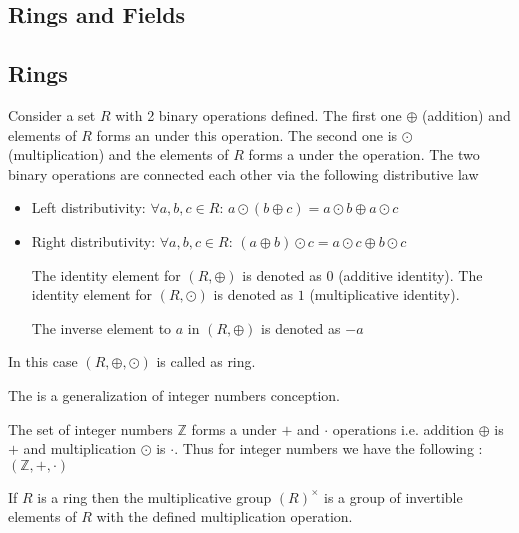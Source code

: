 \begin{appendices}
\section{Rings and Fields}

\subsection{Rings}

\begin{definition}[Ring]
  Consider a set $R$ with 2 binary operations defined. The first one
  $\oplus$ (addition) and elements of $R$ forms an
  under this operation. The second one is $\odot$ (multiplication) and
  the elements of $R$ forms a  under 
  the operation. The two binary operations are connected each other
  via the following distributive law
  \begin{itemize}
  \item Left distributivity:
    $\forall a,b,c \in R$:
    $a \odot \left(b \oplus c\right) =
    a \odot b \oplus a \odot c$
  \item Right distributivity:
    $\forall a,b,c \in R$:
    $\left( a \oplus b \right) \odot c =
    a \odot c \oplus b \odot c$
    
  The identity element for $\left(R, \oplus\right)$ is denoted as $0$
  (additive identity).
  The identity element for $\left(R, \odot\right)$ is denoted as $1$
  (multiplicative identity).

  The inverse element to $a$ in $\left(R, \oplus\right)$ is denoted as $-a$
  \end{itemize}

  In this case $\left(R, \oplus, \odot\right)$ is called as ring.
  \label{def:ring}
\end{definition}

The  is a generalization of integer numbers conception.
\begin{example}
  The set of integer numbers $\mathbb{Z}$ forms a 
  under $+$ and $\cdot$ operations i.e. addition $\oplus$ is
  $+$ and multiplication $\odot$ is $\cdot$. Thus for integer
  numbers we have the following :
  $\left(\mathbb{Z}, +, \cdot\right)$
  \label{ex:ring}
\end{example}

\begin{definition}
  If $R$ is a ring then the multiplicative group
  $\left(R\right)^\times$
  is a group of
  invertible elements of $R$ with the defined multiplication operation.
  \label{def:multiplicativegroup}
\end{definition}


\end{appendices}
